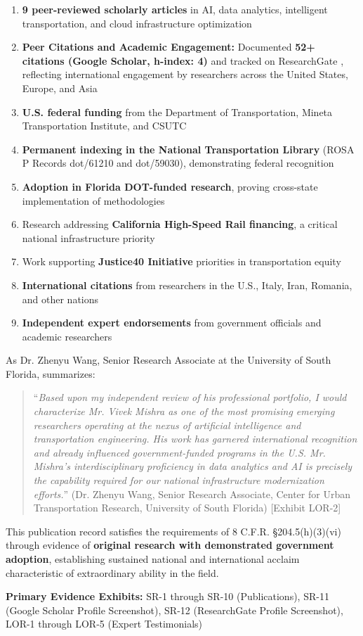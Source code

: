 \begin{enumerate}
    \item [$\checkmark$] \textbf{9 peer-reviewed scholarly articles} in AI, data analytics, intelligent transportation, and cloud infrastructure optimization
    \item [$\checkmark$] \textbf{Peer Citations and Academic Engagement:} Documented \textbf{52+ citations (Google Scholar, h-index: 4)} \cite{SR11} and tracked on ResearchGate \cite{SR12}, reflecting international engagement by researchers across the United States, Europe, and Asia
    \item [$\checkmark$] \textbf{U.S. federal funding} from the Department of Transportation, Mineta Transportation Institute, and CSUTC
    \item [$\checkmark$] \textbf{Permanent indexing in the National Transportation Library} (ROSA P Records dot/61210 and dot/59030), demonstrating federal recognition
    \item [$\checkmark$] \textbf{Adoption in Florida DOT-funded research}, proving cross-state implementation of methodologies
    \item [$\checkmark$] Research addressing \textbf{California High-Speed Rail financing}, a critical national infrastructure priority
    \item [$\checkmark$] Work supporting \textbf{Justice40 Initiative} priorities in transportation equity
    \item [$\checkmark$] \textbf{International citations} from researchers in the U.S., Italy, Iran, Romania, and other nations
    \item [$\checkmark$] \textbf{Independent expert endorsements} from government officials and academic researchers
\end{enumerate}

As Dr. Zhenyu Wang, Senior Research Associate at the University of South Florida, summarizes:

\begin{quote}
``\textit{Based upon my independent review of his professional portfolio, I would characterize Mr. Vivek Mishra as one of the most promising emerging researchers operating at the nexus of artificial intelligence and transportation engineering. His work has garnered international recognition and already influenced government-funded programs in the U.S. Mr. Mishra’s interdisciplinary proficiency in data analytics and AI is precisely the capability required for our national infrastructure modernization efforts.}'' (Dr. Zhenyu Wang, Senior Research Associate, Center for Urban Transportation Research, University of South Florida) [Exhibit LOR-2]
\end{quote}

This publication record satisfies the requirements of 8 C.F.R. \S 204.5(h)(3)(vi) through evidence of \textbf{original research with demonstrated government adoption}, establishing sustained national and international acclaim characteristic of extraordinary ability in the field.

\textbf{Primary Evidence Exhibits:} SR-1 through SR-10 (Publications), SR-11 (Google Scholar Profile Screenshot), SR-12 (ResearchGate Profile Screenshot), LOR-1 through LOR-5 (Expert Testimonials)

